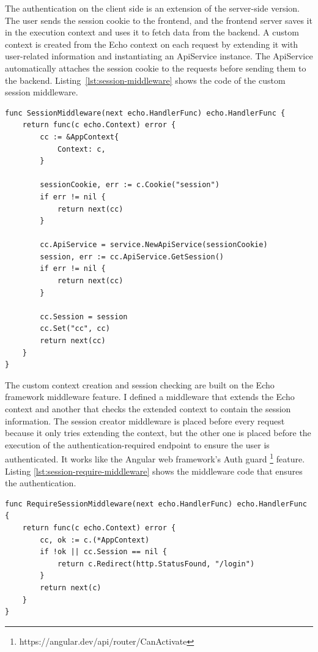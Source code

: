 The authentication on the client side is an extension of the server-side version. The user sends the session cookie to the frontend, and the frontend server saves it in the execution context and uses it to fetch data from the backend. A custom context is created from the Echo context on each request by extending it with user-related information and instantiating an ApiService instance. The ApiService automatically attaches the session cookie to the requests before sending them to the backend. Listing~\ref{lst:session-middleware} shows the code of the custom session middleware.

\begin{lstlisting}[caption=Session middleware code,label=lst:session-middleware]
func SessionMiddleware(next echo.HandlerFunc) echo.HandlerFunc {
	return func(c echo.Context) error {
		cc := &AppContext{
			Context: c,
		}

		sessionCookie, err := c.Cookie("session")
		if err != nil {
			return next(cc)
		}

		cc.ApiService = service.NewApiService(sessionCookie)
		session, err := cc.ApiService.GetSession()
		if err != nil {
			return next(cc)
		}

		cc.Session = session
		cc.Set("cc", cc)
		return next(cc)
	}
}
\end{lstlisting}

The custom context creation and session checking are built on the Echo framework middleware feature. I defined a middleware that extends the Echo context and another that checks the extended context to contain the session information. The session creator middleware is placed before every request because it only tries extending the context, but the other one is placed before the execution of the authentication-required endpoint to ensure the user is authenticated. It works like the Angular web framework's Auth guard \footnote{https://angular.dev/api/router/CanActivate} feature. Listing \ref{lst:session-require-middleware} shows the middleware code that ensures the authentication.

\begin{lstlisting}[caption=Session checking middleware code,label=lst:session-require-middleware]
func RequireSessionMiddleware(next echo.HandlerFunc) echo.HandlerFunc {
	return func(c echo.Context) error {
		cc, ok := c.(*AppContext)
		if !ok || cc.Session == nil {
			return c.Redirect(http.StatusFound, "/login")
		}
		return next(c)
	}
}
\end{lstlisting}

